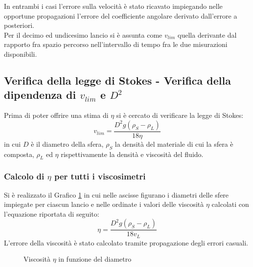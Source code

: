 \documentclass[a4paper,11pt,oneside]{article}
\begin{document}
In entrambi i casi l'errore sulla velocità è stato ricavato impiegando nelle opportune propagazioni l'errore del coefficiente angolare derivato dall'errore a posteriori.\\


Per il decimo ed undicesimo lancio si è assunta come $v_{lim}$ quella derivante dal rapporto fra spazio percorso nell'intervallo di tempo fra le due misurazioni disponibili. 


 



\subsection{Verifica della legge di Stokes - Verifica della dipendenza di $v_{lim}$ e $D^2$}
Prima di poter offrire una stima di $\eta$ si è cercato di verificare la legge di Stokes:
\begin{equation*}
    v_{lim}= \frac{{D}^2g\left(\rho_S - \rho_L\right)}{18 \eta }
\end{equation*}
in cui $D$ è il diametro della sfera, $\rho_S$ la densità del materiale di cui la sfera è composta, $\rho_L$ ed $\eta$ rispettivamente la densità e viscosità del fluido.

\subsubsection*{Calcolo di $\eta$ per tutti i viscosimetri}
Si è realizzato il Grafico \ref{fig:eta} in cui nelle ascisse figurano i diametri delle sfere impiegate per ciascun lancio e nelle ordinate i valori delle viscosità $\eta$ calcolati con l'equazione riportata di seguito:
\begin{equation*}
    \eta= \frac{{D}^2g\left(\rho_S - \rho_L\right)}{18 v_{L}} 
\end{equation*}
L'errore della viscosità è stato calcolato tramite propagazione degli errori casuali.

\begin{figure}
    \centering
    \caption{Viscosità $\eta$ in funzione del diametro}
    \label{fig:eta}
\end{figure}


\end{document}
